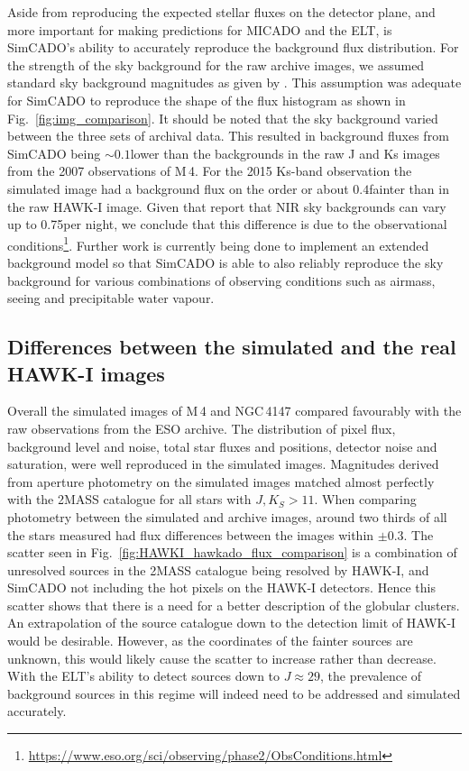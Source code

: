 Aside from reproducing the expected stellar fluxes on the detector plane, and more important for making predictions for MICADO and the ELT, is SimCADO's ability to accurately reproduce the background flux distribution. For the strength of the sky background for the raw archive images, we assumed standard sky background magnitudes as given by \citet{cuby2000}. This assumption was adequate for SimCADO to reproduce the shape of the flux histogram as shown in Fig.~\ref{fig:img_comparison}. It should be noted that the sky background varied between the three sets of archival data. This resulted in background fluxes from SimCADO being $\sim 0.1$\m lower than the backgrounds in the raw J and Ks images from the 2007 observations of M\,4. For the 2015 Ks-band observation the simulated image had a background flux on the order or about $0.4$\m fainter than in the raw HAWK-I image. Given that \citet{moreels08} report that NIR sky backgrounds can vary up to 0.75\m per night, we conclude that this difference is due to the observational conditions\footnote{\url{https://www.eso.org/sci/observing/phase2/ObsConditions.html}}. Further work is currently being done to implement an extended background model so that SimCADO is able to also reliably reproduce the sky background for various combinations of observing conditions such as airmass, seeing and precipitable water vapour. 


\subsection{Differences between the simulated and the real HAWK-I images}

Overall the simulated images of M\,4 and NGC\,4147 compared favourably with the raw observations from the ESO archive. The distribution of pixel flux, background level and noise, total star fluxes and positions, detector noise and saturation, were well reproduced in the simulated images. Magnitudes derived from aperture photometry on the simulated images matched almost perfectly with the 2MASS catalogue for all stars with $J, K_S > 11$\m. When comparing photometry between the simulated and archive images, around two thirds of all the stars measured had flux differences between the images within $\pm 0.3$\m. The scatter seen in Fig.~\ref{fig:HAWKI_hawkado_flux_comparison} is a combination of unresolved sources in the 2MASS catalogue being resolved by HAWK-I, and SimCADO not including the hot pixels on the HAWK-I detectors. Hence this scatter shows that there is a need for a better description of the globular clusters. An extrapolation of the source catalogue down to the detection limit of HAWK-I would be desirable. However, as the coordinates of the fainter sources are unknown, this would likely cause the scatter to increase rather than decrease. With the ELT's ability to detect sources down to $J\approx 29$\m, the prevalence of background sources in this regime will indeed need to be addressed and simulated accurately.

